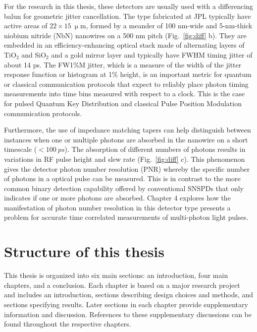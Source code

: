 \documentclass[11pt]{caltech_thesis} %
\begin{document}
For the research in this thesis, these detectors are usually used with a differencing balun for geometric jitter cancellation. The type fabricated at JPL typically have active areas of $22 \times 15 \ \mathrm{\upmu m}$, formed by a meander of 100 nm-wide and 5-nm-thick niobium nitride (NbN) nanowires on a 500 nm pitch (Fig.~\ref{fig:diff} b). They are embedded in an efficiency-enhancing optical stack made of alternating layers of TiO$_2$ and SiO$_2$ and a gold mirror layer and typically have FWHM timing jitter of about 14 ps. The FW1\%M jitter, which is a measure of the width of the jitter response function or histogram at 1\% height, is an important metric for quantum or classical communication protocols that expect to reliably place photon timing measurements into time bins measured with respect to a clock. This is the case for pulsed Quantum Key Distribution and classical Pulse Position Modulation communication protocols.

Furthermore, the use of impedance matching tapers can help distinguish between instances when one or multiple photons are absorbed in the nanowire on a short timescale ($< 100~ps$). The absorption of different numbers of photons results in variations in RF pulse height and slew rate (Fig.~\ref{fig:diff} c). This phenomenon gives the detector photon number resolution (PNR) whereby the specific number of photons in a optical pulse can be measured. This is in contrast to the more common binary detection capability offered by conventional SNSPDs that only indicates if one or more photons are absorbed. Chapter 4 explores how the manifestation of photon number resolution in this detector type presents a problem for accurate time correlated measurements of multi-photon light pulses.

\hypertarget{structure-of-this-thesis}{%
\section{Structure of this thesis}\label{structure-of-this-thesis}}

This thesis is organized into six main sections: an introduction, four main chapters, and a conclusion. Each chapter is based on a major research project and includes an introduction, sections describing design choices and methods, and sections specifying results. Later sections in each chapter provide supplementary information and discussion. References to these supplementary discussions can be found throughout the respective chapters.
\end{document}
